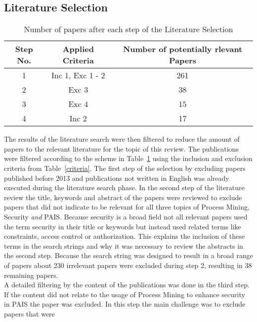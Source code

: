\documentclass[runningheads]{llncs}
\begin{document}
\subsection{Literature Selection}\label{Selection}
\begin{table}[h!]
    \centering
    \begin{tabular}{ |c|c|c|}
        \hline
        \textbf{Step No.} & \textbf{Applied Criteria} & \textbf{Number of potentially rlevant Papers} \\
        \hline
        \hline
        1             & Inc 1, Exc 1 - 2          & 261                       \\
        \hline
        2             & Exc 3                     & 38                        \\
        \hline
        3             & Exc 4                     & 15                        \\
        \hline
        4             & Inc 2                     & 17                        \\
        \hline
    \end{tabular}
    \caption{Number of papers after each step of the Literature Selection}
    \label{selection}
\end{table}
The results of the literature search were then filtered to reduce the amount of papers to the relevant literature for the topic of this review. The publications were filtered according to the scheme in Table~\ref{selection} using the inclusion and exclusion criteria
from Table~\ref{criteria}. The first step of the selection by excluding papers published before 2013 and publications not written in English was already executed during the literature search phase.
In the second step of the literature review the title, keywords and abstract of the papers were reviewed to exclude papers that did not indicate to be relevant for all three topics of Process Mining, Security \textit{and} PAIS. Because security is a broad field not all 
relevant papers used the term security in their title or keywords but instead used related terms like constraints, access control or authorization. This explains the inclusion of these terms in the search strings and why it was necessary to review the abstracts in
the second step. Because the search string was designed to result in a broad range of papers about 230 irrelevant papers were excluded during step 2, resulting in 38 remaining papers.\\
A detailed filtering by the content of the publications was done in the third step. If the content did not relate to the usage of Process Mining to enhance security in PAIS the paper was excluded. In this step the main challenge was to exclude papers that were
\end{document}
